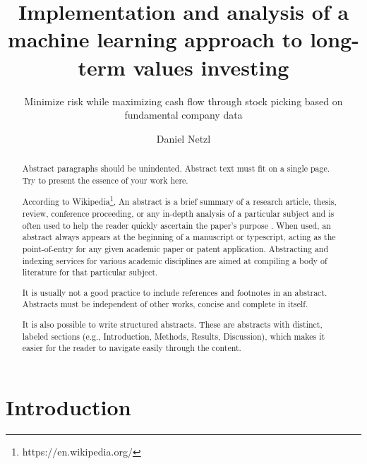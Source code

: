 \documentclass{imc-inf}
\title{Implementation and analysis of a machine learning approach to long-term values investing}
\subtitle{Minimize risk while maximizing cash flow through stock picking based on fundamental company data}
\author{Daniel Netzl}
\begin{document}
\frontmatter\maketitle{}


\begin{declarations}\end{declarations}



\begin{abstract}
	Abstract paragraphs should be unindented. Abstract text must fit on a single page. Try to present the essence of your work here. 
	
	According to Wikipedia\footnote{https://en.wikipedia.org/}, An abstract is a brief summary of a research article, thesis, review, conference proceeding, or any in-depth analysis of a particular subject and is often used to help the reader quickly ascertain the paper's purpose \cite{988366}. When used, an abstract always appears at the beginning of a manuscript or typescript, acting as the point-of-entry for any given academic paper or patent application. Abstracting and indexing services for various academic disciplines are aimed at compiling a body of literature for that particular subject.
	
	It is usually not a good practice to include references and footnotes in an abstract. Abstracts must be independent of other works, concise and complete in itself. 
	
	It is also possible to write structured abstracts. These are abstracts with distinct, labeled sections (e.g., Introduction, Methods, Results, Discussion), which makes it easier for the reader to navigate easily through the content. 
	
\end{abstract}


%
\tableofcontents%
\clearpage


%
\listoftables
\clearpage


%
\listoffigures
\clearpage


\mainmatter%

\chapter{Introduction}\label{chap:introduction}
\end{document}
